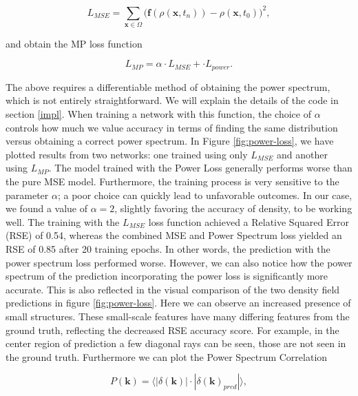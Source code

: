 \documentclass{article}
\begin{document}
\begin{equation}
    L_{MSE} = \sum_{\mathbf{x} \in  \Omega} \Biggl(\mathbf{f}(\rho(\mathbf{x}, t_{n})) - \rho(\mathbf{x}, t_0)\Biggr)^2,
\end{equation}

and obtain the MP loss function

\begin{equation}
    L_{MP} = \alpha \cdot L_{MSE} + \cdot L_{power}.
\end{equation}

The above requires a differentiable method of obtaining the power spectrum, which is not entirely straightforward. We will explain the details of the code in section \ref{impl}. When training a network with this function, the choice of $\alpha$ controls how much we value accuracy in terms of finding the same distribution versus obtaining a correct power spectrum. In Figure \ref{fig:power-loss}, we have plotted results from two networks: one trained using only $L_{MSE}$ and another using $L_{MP}$. The model trained with the Power Loss generally performs worse than the pure MSE model. Furthermore, the training process is very sensitive to the parameter $\alpha$; a poor choice can quickly lead to unfavorable outcomes. In our case, we found a value of $\alpha=2$,  slightly favoring the accuracy of density, to be working well. The training with the $L_{MSE}$ loss function achieved a Relative Squared Error (RSE) of 0.54, whereas the combined MSE and Power Spectrum loss yielded an RSE of 0.85 after 20 training epochs. In other words, the prediction with the power spectrum loss performed worse. However, we can also notice how the power spectrum of the prediction incorporating the power loss is significantly more accurate. This is also reflected in the visual comparison of the two density field predictions in figure \ref{fig:power-loss}. Here we can observe an increased presence of small structures. These small-scale features have many differing features from the ground truth, reflecting the decreased RSE accuracy score. For example, in the center region of prediction a few diagonal rays can be seen, those are not seen in the ground truth. Furthermore we can plot the Power Spectrum Correlation 


\begin{equation}
    P(\mathbf{k}) = \langle |\delta(\mathbf{k})| \cdot |\delta(\mathbf{k})_{pred}| \rangle,
\end{equation}
\end{document}
